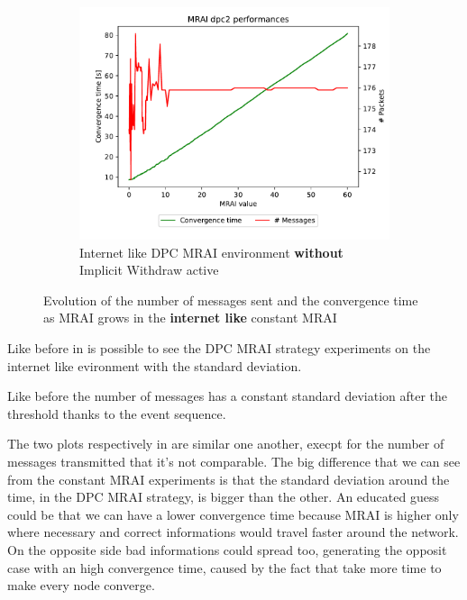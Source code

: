 \documentclass[10pt,conference,letterpaper]{IEEEtran}
\newcommand{\figwidth}{0.78}
\newcommand{\figvspace}{-1.5em}
\begin{document}
\begin{figure}[tb]
	\begin{subfigure}{\columnwidth}
		\centering
		\includegraphics[width=\figwidth\columnwidth]{images/internet_like/graph-100-dpc-noIW/mrai_evolution}
		\caption{Internet like \ac{DPC} \ac{MRAI} environment \textbf{without} Implicit Withdraw active}
		\label{fig:dpc_mrai_evolution_noIW}
		\qquad
	\end{subfigure}

	\caption{Evolution of the number of messages sent and the convergence time as \ac{MRAI} grows
		in the \textbf{internet like} constant \ac{MRAI}}
	\label{fig:dpc_mrai_evolution}
	\vspace{\figvspace}
\end{figure}

Like before in  is possible to see the
\ac{DPC} \ac{MRAI} strategy experiments on the internet like evironment with
the standard deviation.

Like before the number of messages has a constant standard deviation after the
threshold thanks to the event sequence.

The two plots respectively in 
are similar one another, execpt for the number of messages transmitted that it's
not comparable.
The big difference that we can see from the constant \ac{MRAI} experiments is that
the standard deviation around the time, in the \ac{DPC} \ac{MRAI} strategy, is 
bigger than the other. An educated guess could be that we can have a lower 
convergence time because \ac{MRAI} is higher only where necessary and correct 
informations would travel faster around the network. On the opposite side 
bad informations could spread too, generating the opposit case with an high
convergence time, caused by the fact that take more time to make every node 
converge.
\end{document}
